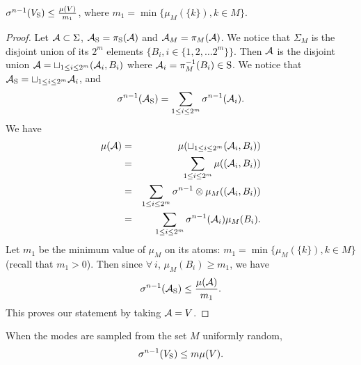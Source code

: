 \begin{lemma}$\sigma^{n-1}(V_{\text{S}}) \leq \frac{\mu(V)}{m_1}$, where $m_1 = \min \{\mu_M(\{k\}), k \in M\}$.\end{lemma}
\begin{proof}

Let $\mathcal{A} \subset \Sigma$, $\mathcal{A}_{\text{S}} = \pi_{\text{S}} (\mathcal{A})$ and $\mathcal{A}_M = \pi_M (\mathcal{A})$. We notice that $\Sigma_M$ is the disjoint union of its $2^m$ elements $\{B_i, i \in \{1,2, \ldots 2^m\} \}$. Then $\mathcal{A}$ is the disjoint union $\mathcal{A} = \sqcup_{1 \leq i \leq 2^m} (\mathcal{A}_i, B_i)$ where $\mathcal{A}_i = \pi_M^{-1} (B_i) \in \text{S}$. We notice that 
$\mathcal{A}_{\text{S}} = \sqcup_{1 \leq i \leq 2^m} \mathcal{A}_i$, 
and
\begin{equation*}
\sigma^{n-1} (\mathcal{A}_{\text{S}}) = \sum_{1 \leq i \leq 2^m} \sigma^{n-1} (\mathcal{A}_i).
\end{equation*}
We have 
\begin{eqnarray*}
\mu(\mathcal{A}) &=& \mu(\sqcup_{1 \leq i \leq 2^m} (\mathcal{A}_i, B_i)) \\
&=& \sum_{1 \leq i \leq 2^m} \mu( (\mathcal{A}_i, B_i)) \\
 &=& \sum_{1 \leq i \leq 2^m} \sigma^{n-1} \otimes \mu_M ((\mathcal{A}_i, B_i)) \\
 & = &\sum_{1 \leq i \leq 2^m} \sigma^{n-1}(\mathcal{A}_i) \mu_M (B_i).
\end{eqnarray*}
Let $m_1$ be the minimum value  of $\mu_M$ on its atoms: $m_1 = \min \{\mu_M(\{k\}), k \in M\}$ (recall that $m_1 > 0$). Then since $ \forall \ i$, $\mu_M(B_i) \geq m_1$, we have
\begin{equation}
\sigma^{n-1}(\mathcal{A}_{\text{S}}) \leq \frac{\mu(\mathcal{A})}{m_1}.
\end{equation}
This proves our statement by taking $\mathcal{A} = V$.
\end{proof}

\begin{corollary} \label{cor:measure}When the modes are sampled from the set $M$ uniformly random, 
\begin{equation*}\sigma^{n-1}(V_{\text{S}}) \leq m \mu(V). \end{equation*}
\end{corollary}

